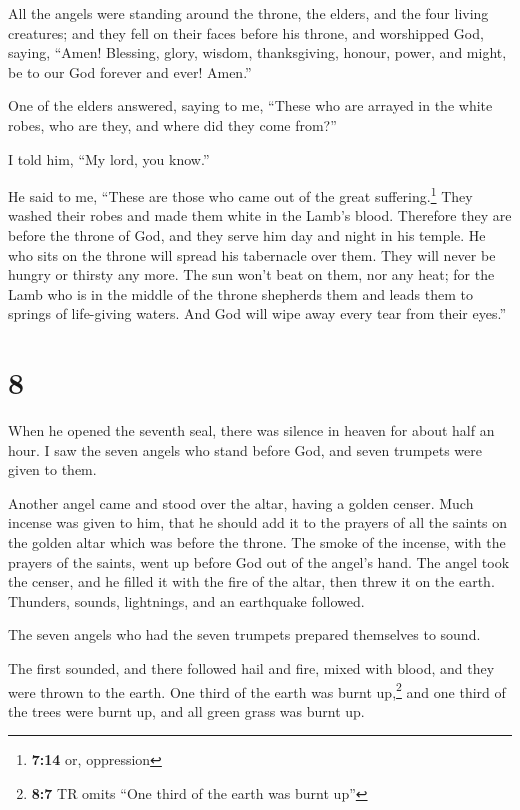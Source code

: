  All the angels were standing around the throne, the
elders, and the four living creatures; and they fell on their faces
before his throne, and worshipped God,  saying, ``Amen!
Blessing, glory, wisdom, thanksgiving, honour, power, and might, be to
our God forever and ever! Amen.''

 One of the elders answered, saying to me, ``These who
are arrayed in the white robes, who are they, and where did they come
from?''

 I told him, ``My lord, you know.''

He said to me, ``These are those who came out of the great
suffering.\footnote{\textbf{7:14} or, oppression} They washed their
robes and made them white in the Lamb's blood.  Therefore
they are before the throne of God, and they serve him day and night in
his temple. He who sits on the throne will spread his tabernacle over
them.  They will never be hungry or thirsty any more. The
sun won't beat on them, nor any heat;  for the Lamb who
is in the middle of the throne shepherds them and leads them to springs
of life-giving waters. And God will wipe away every tear from their
eyes.''

\hypertarget{section-7}{%
\section{8}\label{section-7}}

 When he opened the seventh seal, there was silence in
heaven for about half an hour.  I saw the seven angels who
stand before God, and seven trumpets were given to them.

 Another angel came and stood over the altar, having a
golden censer. Much incense was given to him, that he should add it to
the prayers of all the saints on the golden altar which was before the
throne.  The smoke of the incense, with the prayers of the
saints, went up before God out of the angel's hand.  The
angel took the censer, and he filled it with the fire of the altar, then
threw it on the earth. Thunders, sounds, lightnings, and an earthquake
followed.

 The seven angels who had the seven trumpets prepared
themselves to sound.

 The first sounded, and there followed hail and fire,
mixed with blood, and they were thrown to the earth. One third of the
earth was burnt up,\footnote{\textbf{8:7} TR omits ``One third of the
  earth was burnt up''} and one third of the trees were burnt up, and
all green grass was burnt up.

